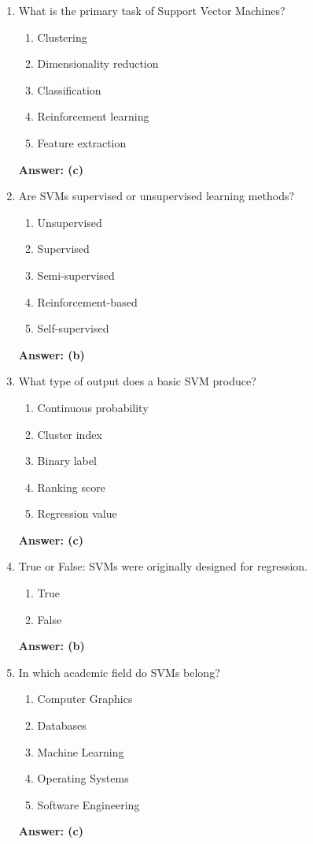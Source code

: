 \documentclass[12pt]{article}
\begin{document}
\begin{enumerate}
	\item What is the primary task of Support Vector Machines?
	\begin{enumerate}
		\item Clustering
		\item Dimensionality reduction
		\item Classification
		\item Reinforcement learning
		\item Feature extraction
	\end{enumerate}
	\textbf{Answer: (c)}
	
	\item Are SVMs supervised or unsupervised learning methods?
	\begin{enumerate}
		\item Unsupervised
		\item Supervised
		\item Semi-supervised
		\item Reinforcement-based
		\item Self-supervised
	\end{enumerate}
	\textbf{Answer: (b)}
	
	\item What type of output does a basic SVM produce?
	\begin{enumerate}
		\item Continuous probability
		\item Cluster index
		\item Binary label
		\item Ranking score
		\item Regression value
	\end{enumerate}
	\textbf{Answer: (c)}
	
	\item True or False: SVMs were originally designed for regression.
	\begin{enumerate}
		\item True
		\item False
	\end{enumerate}
	\textbf{Answer: (b)}
	
	\item In which academic field do SVMs belong?
	\begin{enumerate}
		\item Computer Graphics
		\item Databases
		\item Machine Learning
		\item Operating Systems
		\item Software Engineering
	\end{enumerate}
	\textbf{Answer: (c)}
\end{enumerate}
\end{document}
